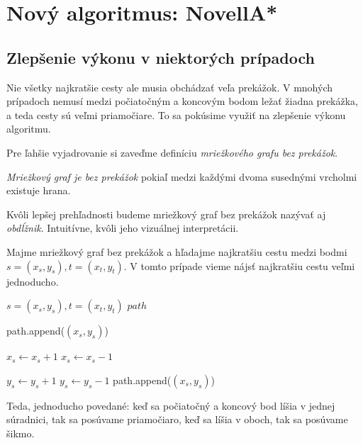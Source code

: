 \chapter{Nový algoritmus: NovellA*}

\section{Zlepšenie výkonu v niektorých prípadoch}
Nie všetky najkratšie cesty ale musia obchádzať veľa prekážok. 
V mnohých prípadoch nemusí medzi počiatočným a koncovým bodom ležať žiadna prekážka, a teda cesty sú veľmi priamočiare. To sa pokúsime využiť na zlepšenie výkonu algoritmu.
 
Pre ľahšie vyjadrovanie si zaveďme definíciu {\sl mriežkového grafu bez prekážok}.

\begin{define}
{\sl Mriežkový graf je bez prekážok} 
pokiaľ medzi každými dvoma susednými vrcholmi existuje hrana.
\end{define}


Kvôli lepšej prehľadnosti budeme mriežkový graf bez prekážok nazývať aj {\sl obdĺžnik}.
Intuitívne, kvôli jeho vizuálnej interpretácii.

Majme mriežkový graf bez prekážok a hľadajme najkratšiu cestu medzi bodmi $s=(x_s,y_s), t=(x_t,y_t)$.
V tomto prípade vieme nájsť najkratšiu cestu veľmi jednoducho.

\begin{algorithm}
\caption{Nájdi najkratšiu cestu medzi dvoma bodmi {\sl s} a {\sl t} na mriežkovom grafe bez prekážok}
\label{alg1}
\begin{algorithmic}[1] %
\REQUIRE $s=(x_s,y_s), t=(x_t,y_t)$
\ENSURE $path$


\STATE path.append($(x_s, y_s)$)

		\STATE $x_s \leftarrow x_s + 1$
		\STATE $x_s \leftarrow x_s - 1$
	\ENDIF

		\STATE $y_s \leftarrow y_s + 1$
		\STATE $y_s \leftarrow y_s - 1$
	\ENDIF
	\STATE path.append($(x_s, y_s)$)
\ENDWHILE

\end{algorithmic}
\end{algorithm}



Teda, jednoducho povedané: keď sa počiatočný a koncový bod líšia v jednej súradnici, tak sa posúvame priamočiaro,
keď sa líšia v oboch, tak sa posúvame šikmo.



